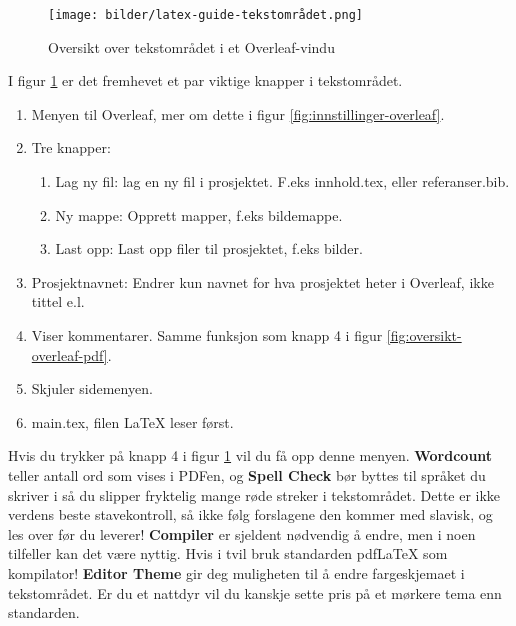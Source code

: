         
        
        \begin{figure}[H]
            \centering
            \texttt{[image: bilder/latex-guide-tekstområdet.png]}
            \caption{Oversikt over tekstområdet i et Overleaf-vindu}
            \label{fig:oversikt-overleaf-tekstområdet}
        \end{figure} 
        
        I figur \ref{fig:oversikt-overleaf-tekstområdet} er det fremhevet et par viktige knapper i tekstområdet.
        \begin{enumerate}
            \item Menyen til Overleaf, mer om dette i figur \ref{fig:innstillinger-overleaf}.
            \item Tre knapper:
            \begin{enumerate}
                \item Lag ny fil: lag en ny fil i prosjektet. F.eks innhold.tex, eller referanser.bib.
                \item Ny mappe: Opprett mapper, f.eks bildemappe.
                \item Last opp: Last opp filer til prosjektet, f.eks bilder.
            \end{enumerate}
            \item Prosjektnavnet: Endrer kun navnet for hva prosjektet heter i Overleaf, ikke tittel e.l.
            \item Viser kommentarer. Samme funksjon som knapp 4 i figur \ref{fig:oversikt-overleaf-pdf}.
            \item Skjuler sidemenyen.
            \item main.tex, filen \LaTeX{} leser først.
        \end{enumerate}
    
    Hvis du trykker på knapp 4 i figur \ref{fig:oversikt-overleaf-tekstområdet} vil du få opp denne menyen. \textbf{Wordcount} teller antall ord som vises i PDFen, og \textbf{Spell Check} bør byttes til språket du skriver i så du slipper fryktelig mange røde streker i tekstområdet. Dette er ikke verdens beste stavekontroll, så ikke følg forslagene den kommer med slavisk, og les over før du leverer!
    \textbf{Compiler} er sjeldent nødvendig å endre, men i noen tilfeller kan det være nyttig. Hvis i tvil bruk standarden pdfLaTeX som kompilator!
    \textbf{Editor Theme} gir deg muligheten til å endre fargeskjemaet i tekstområdet. Er du et nattdyr vil du kanskje sette pris på et mørkere tema enn standarden.
    
